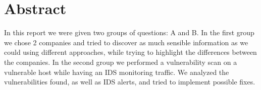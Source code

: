 \section{Abstract}

In this report we were given two groups of questions: A and B. In the first group we chose 2 companies and tried to discover as much sensible information as we could using different approaches, while trying to highlight the differences between the companies. In the second group we performed a vulnerability scan on a vulnerable host while having an IDS monitoring traffic. We analyzed the vulnerabilities found, as well as IDS alerts, and tried to implement possible fixes. 

\pagebreak